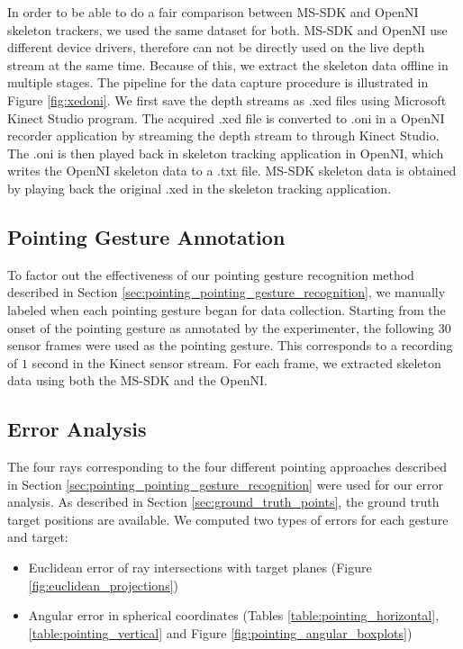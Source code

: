 In order to be able to do a fair comparison between MS-SDK and OpenNI skeleton trackers, we used the same dataset for both. MS-SDK and OpenNI use different device drivers, therefore can not be directly used on the live depth stream at the same time. Because of this, we extract the skeleton data offline in multiple stages. The pipeline for the data capture procedure is illustrated in Figure \ref{fig:xedoni}. We first save the depth streams as .xed files using Microsoft Kinect Studio program. The acquired .xed file is converted to .oni in a OpenNI recorder application by streaming the depth stream to through Kinect Studio. The .oni is then played back in skeleton tracking application in OpenNI, which writes the OpenNI skeleton data to a .txt file. MS-SDK skeleton data is obtained by playing back the original .xed in the skeleton tracking application.

\subsection{Pointing Gesture Annotation}
\label{sec:pointing_gesture_annotation}

To factor out the effectiveness of our pointing gesture recognition method described in Section \ref{sec:pointing_pointing_gesture_recognition}, we manually labeled when each pointing gesture began for data collection. Starting from the onset of the pointing gesture as annotated by the experimenter, the following $30$ sensor frames were used as the pointing gesture. This corresponds to a recording of $1$ second in the Kinect sensor stream. For each frame, we extracted skeleton data using both the MS-SDK and the OpenNI.

\subsection{Error Analysis}
\label{sec:pointing_error_analysis}

The four rays corresponding to the four different pointing approaches described in Section \ref{sec:pointing_pointing_gesture_recognition} were used for our error analysis.  As described in Section \ref{sec:ground_truth_points}, the ground truth target positions are available. We computed two types of errors for each gesture and target:

\begin{itemize}
\item Euclidean error of ray intersections with target planes (Figure \ref{fig:euclidean_projections})
\item Angular error in spherical coordinates (Tables \ref{table:pointing_horizontal},\ref{table:pointing_vertical} and Figure \ref{fig:pointing_angular_boxplots})
\end{itemize}

